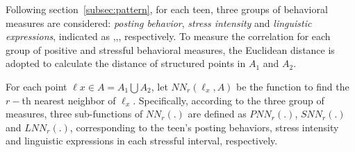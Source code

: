 Following section~\ref{subsec:pattern},
for each teen, three groups of behavioral measures are considered: \emph{posting behavior},
\emph{stress intensity} and \emph{linguistic expressions},
indicated as ,,, respectively.
To measure the correlation for each group of positive and stressful behavioral measures,
the Euclidean distance is adopted to calculate the distance of structured points in $A_1$ and $A_2$.

For each point $\ell x \in A=A_1\bigcup A_2$,
let $NN_r(\ell_x,A)$ be the function to find the $r-$th nearest neighbor of $\ell_x$.
Specifically, according to the three group of measures,
three sub-functions of $NN_r(.)$ are defined as $PNN_r(.)$, $SNN_r(.)$ and $LNN_r(.)$,
corresponding to the teen's posting behaviors, stress intensity and linguistic expressions in each stressful interval,  respectively.

